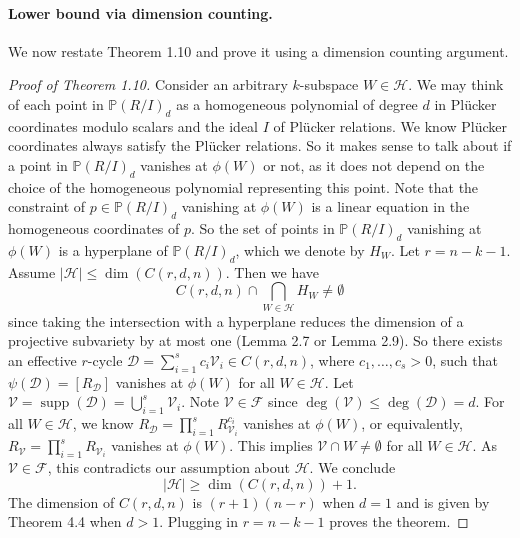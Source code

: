 \documentclass[10pt,a4paper]{article}
\newcommand{\PP}{\mathbb P}
\newcommand{\supp}{\operatorname{supp}}
\begin{document}
\paragraph{Lower bound via dimension counting.}
We now restate Theorem 1.10 and prove it using a dimension counting argument.
\begin{proof}[Proof of Theorem 1.10]
Consider an arbitrary $k$-subspace $W\in\mathcal H$. We may think of each point in $\PP(R/I)_d$ as a homogeneous polynomial of degree $d$ in Pl\"ucker coordinates modulo scalars and the ideal $I$ of Pl\"ucker relations. We know Pl\"ucker coordinates always satisfy the Pl\"ucker relations. So it makes sense to talk about if a point in $\PP(R/I)_d$ vanishes at $\phi(W)$ or not, as it does not depend on the choice of the homogeneous polynomial representing this point. Note that the constraint of $p\in\PP(R/I)_d$ vanishing at $\phi(W)$ is a linear equation in the homogeneous coordinates of $p$. So the set of points in $\PP(R/I)_d$ vanishing at $\phi(W)$ is a hyperplane of $\PP(R/I)_d$, which we denote by $H_W$.
Let $r=n-k-1$. Assume $|\mathcal H|\le\dim(C(r,d,n))$. Then we have
\[C(r,d,n)\cap\bigcap_{W\in\mathcal H}H_W\ne\emptyset\]
since taking the intersection with a hyperplane reduces the dimension of a projective subvariety by at most one (Lemma 2.7 or Lemma 2.9). So there exists an effective $r$-cycle $\mathcal D=\sum_{i=1}^s c_i\mathcal V_i\in C(r,d,n)$, where $c_1,\ldots,c_s>0$, such that $\psi(\mathcal D)=[R_{\mathcal D}]$ vanishes at $\phi(W)$ for all $W\in\mathcal H$.
Let $\mathcal V=\supp(\mathcal D)=\bigcup_{i=1}^s\mathcal V_i$. Note $\mathcal V\in\mathcal F$ since $\deg(\mathcal V)\le\deg(\mathcal D)=d$. For all $W\in\mathcal H$, we know $R_{\mathcal D}=\prod_{i=1}^sR_{\mathcal V_i}^{c_i}$ vanishes at $\phi(W)$, or equivalently, $R_{\mathcal V}=\prod_{i=1}^sR_{\mathcal V_i}$ vanishes at $\phi(W)$. This implies $\mathcal V\cap W\ne\emptyset$ for all $W\in\mathcal H$. As $\mathcal V\in\mathcal F$, this contradicts our assumption about $\mathcal H$. We conclude
\[|\mathcal H|\ge\dim(C(r,d,n))+1.\]
The dimension of $C(r,d,n)$ is $(r+1)(n-r)$ when $d=1$ and is given by Theorem 4.4 when $d>1$. Plugging in $r=n-k-1$ proves the theorem.
\end{proof}
\end{document}
